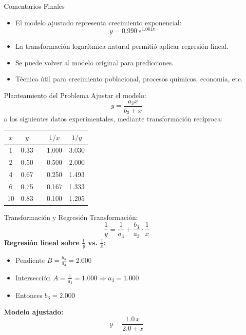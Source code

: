 \documentclass[main.tex]{subfiles}
\begin{document}
\begin{frame}{Comentarios Finales}
  \begin{itemize}
    \item El modelo ajustado representa crecimiento exponencial:
    \[
      y = 0.990 \, e^{1.001x}
    \]
    \item La transformación logarítmica natural permitió aplicar regresión lineal.
    \item Se puede volver al modelo original para predicciones.
    \item Técnica útil para crecimiento poblacional, procesos químicos, economía, etc.
  \end{itemize}
\end{frame}
\begin{frame}{Planteamiento del Problema}
  \small
  Ajustar el modelo:
  \[
    y = \frac{a_3 x}{b_3 + x}
  \]
  a los siguientes datos experimentales, mediante transformación recíproca:

  \begin{center}
    \begin{tabular}{ccc|cc}
    \hline
    \(x\) & \(y\) &  & \(1/x\) & \(1/y\) \\
    \hline
    1 & 0.33 &  & 1.000 & 3.030 \\
    2 & 0.50 &  & 0.500 & 2.000 \\
    4 & 0.67 &  & 0.250 & 1.493 \\
    6 & 0.75 &  & 0.167 & 1.333 \\
    10 & 0.83 & & 0.100 & 1.205 \\
    \hline
    \end{tabular}
  \end{center}
\end{frame}

\begin{frame}{Transformación y Regresión}
  \small
  Transformación:
  \[
    \frac{1}{y} = \frac{1}{a_3} + \frac{b_3}{a_3} \cdot \frac{1}{x}
  \]
  \textbf{Regresión lineal sobre \(\frac{1}{y}\) vs. \(\frac{1}{x}\):}
  \begin{itemize}
    \item Pendiente \(B = \frac{b_3}{a_3} = 2.000\)
    \item Intersección \(A = \frac{1}{a_3} = 1.000 \Rightarrow a_3 = 1.000\)
    \item Entonces \(b_3 = 2.000\)
  \end{itemize}
  \textbf{Modelo ajustado:}
  \[
    y = \frac{1.0 \, x}{2.0 + x}
  \]
\end{frame}
\end{document}
